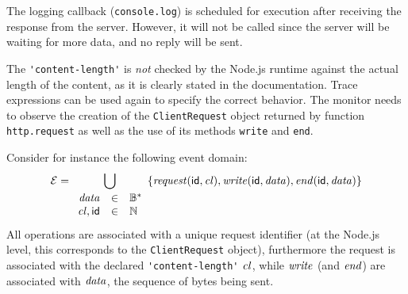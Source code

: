 The logging callback (\lstinline{console.log}) is scheduled for execution after receiving the response from the server.
However, it will not be called since the server will be waiting for more data, and no reply will be sent.

The \lstinline{'content-length'} is \emph{not} checked by the Node.js runtime against the actual length of the content, as it is clearly stated in the documentation.
Trace expressions can be used again to specify the correct behavior.
The monitor needs to observe the creation of the \lstinline{ClientRequest} object returned by function \lstinline{http.request} as well as the use of its methods \lstinline{write} and \lstinline{end}.

Consider for instance the following event domain:
\[ \mathcal{E} = \bigcup_{\begin{array}{rcl}\mathit{data}&\in&\mathbb{B}^*\\\mathit{cl},\mathsf{id} &\in& \mathbb{N}\end{array}} \{ \mathit{request}(\mathsf{id},\mathit{cl}), \mathit{write}(\mathsf{id}, \mathit{data}), \mathit{end}(\mathsf{id}, \mathit{data}) \} \]
All operations are associated with a unique request identifier (at the Node.js level, this corresponds to the \lstinline{ClientRequest} object), furthermore the request is associated with the declared \lstinline{'content-length'} \(\mathit{cl}\), while \(\mathit{write}\) (and \(\mathit{end}\)) are associated with \(\mathit{data}\),
the sequence of bytes being sent.




